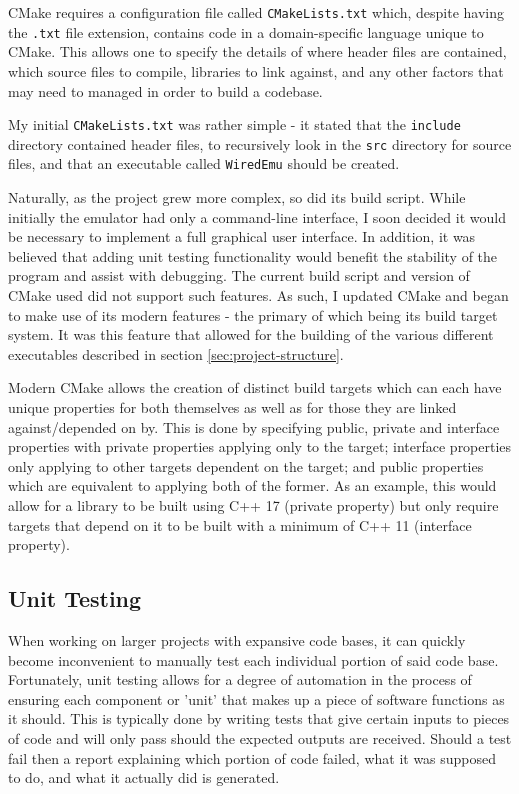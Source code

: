     CMake requires a configuration file called \texttt{CMakeLists.txt} which, despite having the \texttt{.txt} file extension, contains code in a domain-specific language unique to CMake. This allows one to specify the details of where header files are contained, which source files to compile, libraries to link against, and any other factors that may need to managed in order to build a codebase.

    My initial \texttt{CMakeLists.txt} was rather simple - it stated that the \texttt{include} directory contained header files, to recursively look in the \texttt{src} directory for source files, and that an executable called \texttt{WiredEmu} should be created.

    Naturally, as the project grew more complex, so did its build script. While initially the emulator had only a command-line interface, I soon decided it would be necessary to implement a full graphical user interface. In addition, it was believed that adding unit testing functionality would benefit the stability of the program and assist with debugging. The current build script and version of CMake used did not support such features. As such, I updated CMake and began to make use of its modern features - the primary of which being its build target system. It was this feature that allowed for the building of the various different executables described in section \ref{sec:project-structure}.

    Modern CMake allows the creation of distinct build targets which can each have unique properties for both themselves as well as for those they are linked against/depended on by. This is done by specifying public, private and interface properties with private properties applying only to the target; interface properties only applying to other targets dependent on the target; and public properties which are equivalent to applying both of the former. As an example, this would allow for a library to be built using C++ 17 (private property) but only require targets that depend on it to be built with a minimum of C++ 11 (interface property).

\subsection{Unit Testing}
    When working on larger projects with expansive code bases, it can quickly become inconvenient to manually test each individual portion of said code base. Fortunately, unit testing allows for a degree of automation in the process of ensuring each component or 'unit' that makes up a piece of software functions as it should. This is typically done by writing tests that give certain inputs to pieces of code and will only pass should the expected outputs are received. Should a test fail then a report explaining which portion of code failed, what it was supposed to do, and what it actually did is generated.

